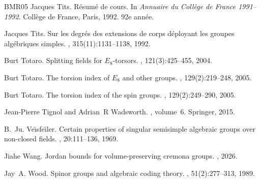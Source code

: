 \begin{thebibliography}{BMR05}
Jacques Tits.
\newblock R{\'e}sum{\'e} de cours.
\newblock In {\em Annuaire du Coll{\`e}ge de France 1991--1992}. Coll{\`e}ge de France, Paris, 1992.
\newblock 92e ann{\'e}e.

Jacques Tits.
\newblock Sur les degr\'{e}s des extensions de corps d\'{e}ployant les groupes alg\'{e}briques simples.
, 315(11):1131--1138, 1992.

Burt Totaro.
\newblock Splitting fields for {$E_8$}-torsors.
, 121(3):425--455, 2004.

Burt Totaro.
\newblock The torsion index of {$E_8$} and other groups.
, 129(2):219--248, 2005.

Burt Totaro.
\newblock The torsion index of the spin groups.
, 129(2):249--290, 2005.

Jean-Pierre Tignol and Adrian~R Wadsworth.
, volume~6.
\newblock Springer, 2015.

B.~Ju. Ve{\u{\i}}sfe{\u{\i}}ler.
\newblock Certain properties of singular semisimple algebraic groups over non-closed fields.
, 20:111--136, 1969.

Jiahe Wang.
\newblock Jordan bounds for volume-preserving cremona groups.
, 2026.

Jay~A. Wood.
\newblock Spinor groups and algebraic coding theory.
, 51(2):277--313, 1989.

\end{thebibliography}
